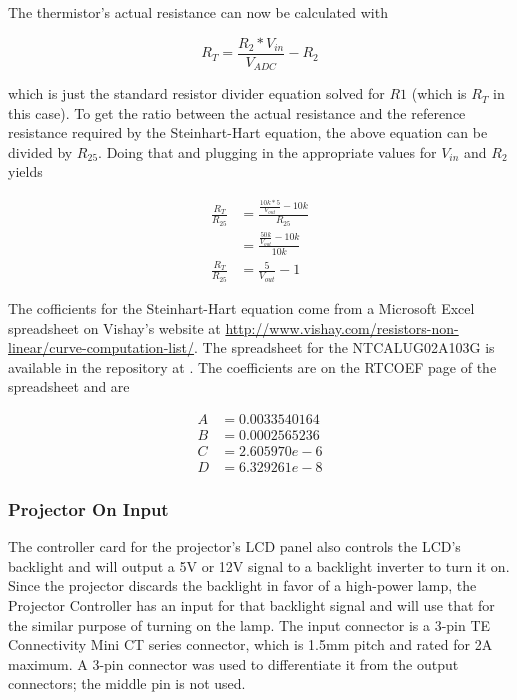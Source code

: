 \documentclass{article}
\begin{document}
The thermistor's actual resistance can now be calculated with

\[
R_T = \frac{R_2*V_{in}}{V_{ADC}} - R_2
\]

which is just the standard resistor divider equation solved for $R1$ (which is $R_T$ in this case).
To get the ratio between the actual resistance and the reference resistance required by the 
Steinhart-Hart equation, the above equation can be divided by $R_{25}$.  Doing that and plugging in
the appropriate values for $V_{in}$ and $R_2$ yields

\begin{align*}
    \frac{R_T}{R_{25}} &= \frac{\frac{10k * 5}{V_{out}} - 10k}{R_{25}} \\
    &= \frac{\frac{50k}{V_{out}} - 10k}{10k} \\
    \frac{R_T}{R_{25}} &= \frac{5}{V_{out}} - 1
\end{align*}

The cofficients for the Steinhart-Hart equation come from a Microsoft Excel spreadsheet on Vishay's
website at \url{http://www.vishay.com/resistors-non-linear/curve-computation-list/}.  The
spreadsheet for the NTCALUG02A103G is available in the repository at
.  The coefficients are on the RTCOEF page of the
spreadsheet and are

\begin{align*}
    A &= 0.0033540164 \\
    B &= 0.0002565236 \\
    C &= 2.605970e-6 \\
    D &= 6.329261e-8
\end{align*}

\subsubsection{Projector On Input} \label{sssec:PJOnInput}
The controller card for the projector's LCD panel also controls the LCD's backlight and will output
a 5V or 12V signal to a backlight inverter to turn it on.  Since the projector discards the
backlight in favor of a high-power lamp, the Projector Controller has an input for that backlight
signal and will use that for the similar purpose of turning on the lamp.  The input connector is a
3-pin TE Connectivity Mini CT series connector, which is 1.5mm pitch and rated for 2A maximum.  A
3-pin connector was used to differentiate it from the output connectors; the middle pin is not used.
\end{document}
